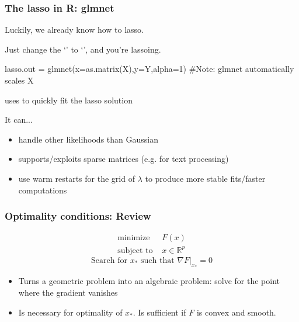 \documentclass{beamer}
\begin{document}
\begin{frame}[fragile]
\frametitle{The lasso in R: glmnet}
Luckily, we already know how to lasso.  
\vsp

Just change the `' to `', and you're lassoing.
\begin{blockcode}
lasso.out = glmnet(x=as.matrix(X),y=Y,alpha=1)
#Note: glmnet automatically scales X
\end{blockcode}

\vsp
{} uses  to quickly fit the lasso solution

\vsp  
It can...
\begin{itemize}
\item handle other likelihoods than Gaussian
\item supports/exploits sparse matrices (e.g. for text processing)
\item use warm restarts for the grid of $\lambda$ to produce more stable fits/faster computations
\end{itemize}
\end{frame}
%

\begin{frame}
\frametitle{Optimality conditions: Review}
\begin{align}
\textrm{minimize } & F(x) \\
\textrm{subject to } & x \in \mathbb{R}^p 
\end{align}
\[
\textrm{Search for $x_*$ such that } \nabla F|_{x_*} = 0
\]

\vsp
\begin{itemize}
\item Turns a geometric problem into an algebraic problem: solve for the point where the gradient vanishes
\item Is necessary for optimality of $x_*$.  Is sufficient if $F$ is convex and smooth.
\end{itemize}
\end{frame}
\end{document}

